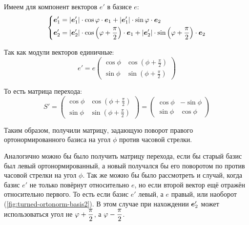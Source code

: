 \documentclass[a4paper,12pt]{article}
\begin{document}
  Имеем для компонент векторов $e'$ в базисе $e$:
  \[
    \left\{
      \begin{aligned}
        &\boldsymbol e_1' = |\boldsymbol e_1'| \cdot \cos\varphi \cdot \boldsymbol e_1 + |\boldsymbol e_1'| \cdot \sin\varphi \cdot \boldsymbol e_2\\
        &\boldsymbol e_2' = |\boldsymbol e_2'| \cdot \cos{\left(\varphi+ \frac{\pi}{2}\right)} \cdot \boldsymbol e_1 + |\boldsymbol e_2'| \cdot \sin{\left(\varphi+ \frac{\pi}{2}\right)} \cdot \boldsymbol e_2
      \end{aligned}
    \right.
  \]
  
  Так как модули векторов единичные:
  \[
    e' = e \begin{pmatrix}
      \cos\phi & \cos{\left(\phi + \frac{\pi}{2}\right)}\\
      \sin\phi & \sin{\left(\phi + \frac{\pi}{2}\right)}
    \end{pmatrix}
  \]
  
  То есть матрица перехода:
  \[
    S' = \begin{pmatrix}
      \cos\phi & \cos{\left(\phi + \frac{\pi}{2}\right)}\\
      \sin\phi & \sin{\left(\phi + \frac{\pi}{2}\right)}
    \end{pmatrix}
    = \begin{pmatrix}
      \cos\phi & -\sin\phi\\
      \sin\phi & \cos\phi
    \end{pmatrix}
  \]
  
  Таким образом, получили матрицу, задающую поворот правого ортонормированного базиса на угол $\phi$ против часовой стрелки.
  
  Аналогично можно бы было получить матрицу перехода, если бы старый базис был левый ортонормированный, а новый получался бы его поворотом по против часовой стрелки на угол $\phi$.
  Так же можно бы было рассмотреть и случай, когда базис $e'$ не только повёрнут относительно $e$, но если второй вектор ещё отражён относительно первого.
  То есть если базис $e'$ левый, а $e$ правый, или наоборот (\ref{fig:turned-ortonorm-basis2}).
  В этом случае при нахождении $\boldsymbol e_2'$ может использоваться угол не $\phi \hm+ \dfrac{\pi}{2}$, а $\phi \hm- \dfrac{\pi}{2}$.
  
\end{document}
